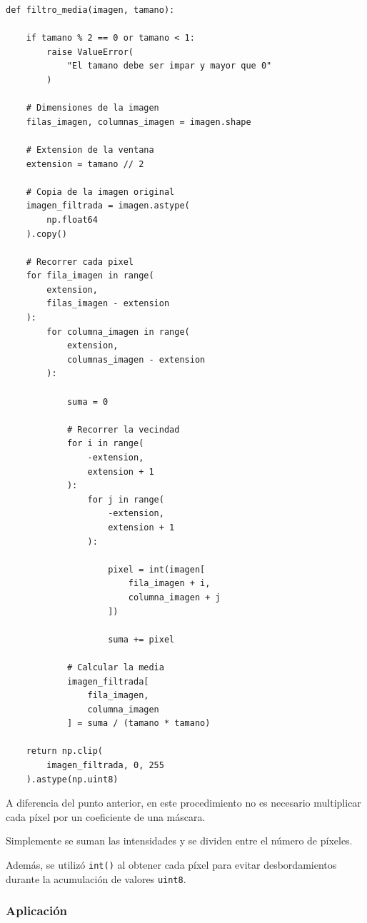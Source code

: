 \documentclass[11pt,letterpaper]{article}
\begin{document}
\begin{lstlisting}
def filtro_media(imagen, tamano):

    if tamano % 2 == 0 or tamano < 1:
        raise ValueError(
            "El tamano debe ser impar y mayor que 0"
        )

    # Dimensiones de la imagen
    filas_imagen, columnas_imagen = imagen.shape

    # Extension de la ventana
    extension = tamano // 2

    # Copia de la imagen original
    imagen_filtrada = imagen.astype(
        np.float64
    ).copy()

    # Recorrer cada pixel
    for fila_imagen in range(
        extension,
        filas_imagen - extension
    ):
        for columna_imagen in range(
            extension,
            columnas_imagen - extension
        ):

            suma = 0

            # Recorrer la vecindad
            for i in range(
                -extension,
                extension + 1
            ):
                for j in range(
                    -extension,
                    extension + 1
                ):

                    pixel = int(imagen[
                        fila_imagen + i,
                        columna_imagen + j
                    ])

                    suma += pixel

            # Calcular la media
            imagen_filtrada[
                fila_imagen,
                columna_imagen
            ] = suma / (tamano * tamano)

    return np.clip(
        imagen_filtrada, 0, 255
    ).astype(np.uint8)
\end{lstlisting}

A diferencia del punto anterior,
en este procedimiento no es necesario
multiplicar cada píxel por un coeficiente
de una máscara.

Simplemente se suman las intensidades
y se dividen entre el número de píxeles.

Además, se utilizó \texttt{int()}
al obtener cada píxel para evitar
desbordamientos durante la acumulación
de valores \texttt{uint8}.

\subsubsection*{Aplicación}
\end{document}
